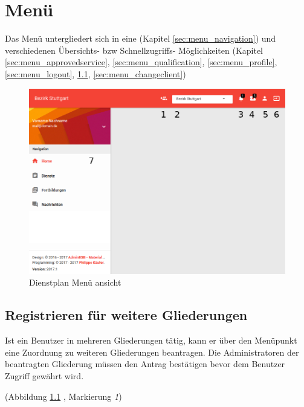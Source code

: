\chapter{Menü}
\label{cha:menu}

Das Menü untergliedert sich in eine  (Kapitel \ref{sec:menu_navigation}) und verschiedenen Übersichts- bzw Schnellzugriffs- Möglichkeiten (Kapitel \ref{sec:menu_approvedservice}, \ref{sec:menu_qualification}, \ref{sec:menu_profile}, \ref{sec:menu_logout}, \ref{sec:menu_applyclient}, \ref{sec:menu_changeclient})

\begin{figure}[h]
 \begin{addmargin}{-0.2\linewidth}
   \centering 
   \includegraphics[width=14cm]{Bilder/view_menu.png}
 \end{addmargin} 
 \caption[Menü ansicht]{Dienstplan Menü ansicht}
 \label{fig:view_menu}
\end{figure}

\section{Registrieren für weitere Gliederungen}
\label{sec:menu_applyclient}
Ist ein Benutzer in mehreren Gliederungen tätig, kann er über den Menüpunkt eine Zuordnung zu weiteren Gliederungen beantragen. Die Administratoren der beantragten Gliederung müssen den Antrag bestätigen bevor dem Benutzer Zugriff gewährt wird.

\noindent (Abbildung \ref{fig:view_menu} \textit{}, Markierung \textit{1})

